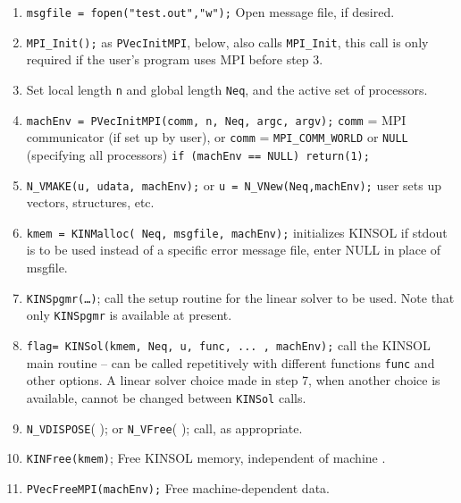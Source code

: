 \begin{enumerate}

\item  {\tt msgfile = fopen("test.out","w");}      Open message file, if 
desired.
                                     

\item  {\tt MPI\_Init();}     as {\tt PVecInitMPI}, below, also calls 
{\tt MPI\_Init}, this call is only required if the user's program uses MPI before step 3.


\item  Set local length {\tt n} and global length {\tt Neq}, and the active 
set of processors.


\item  {\tt machEnv = PVecInitMPI(comm, n, Neq, argc, argv);}
         {\tt comm} = MPI communicator (if set up by user), or
         {\tt comm} = {\tt MPI\_COMM\_WORLD} or {\tt NULL} (specifying all processors)   
    {\tt if (machEnv == NULL) return(1);}
   


\item  {\tt N\_VMAKE(u, udata, machEnv);}     
      or
    {\tt u = N\_VNew(Neq,machEnv);}     user sets up vectors, structures, etc.
  


\item  {\tt kmem = KINMalloc( Neq, msgfile, machEnv);}     initializes KINSOL 
    if stdout is to be used instead of a specific error message file, 
           enter NULL in place of msgfile.  
   

\item  {\tt KINSpgmr(\ldots)};  call the setup routine for the linear solver to be used.
	      Note that only {\tt KINSpgmr} is available at present.
    
\item  {\tt flag= KINSol(kmem, Neq, u, func, ... , machEnv);}
	   call the KINSOL main routine -- can be called repetitively with
	   different functions {\tt func} and other options. A linear solver
	   choice made in step 7, when another choice is available, cannot 
           be changed between {\tt KINSol} calls.   
   
\item {\tt N\_VDISPOSE}(  ); or {\tt N\_VFree}( ); call, as appropriate.

\item  {\tt KINFree(kmem)};       Free KINSOL memory, independent of machine   .
   


\item  {\tt PVecFreeMPI(machEnv);}        Free machine-dependent data.
\end{enumerate}
\vspace{.2 in}

